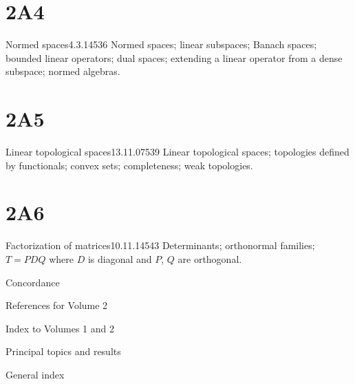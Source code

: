 \section{2A4}{Normed spaces}{4.3.14}{536}{}
{Normed spaces;  linear subspaces;  Banach spaces;
bounded linear operators;  dual spaces;  extending a linear operator
from a dense subspace;  normed algebras.}

\section{2A5}{Linear topological spaces}{13.11.07}{539}{}
{Linear topological spaces;  topologies defined by functionals;
convex sets;  completeness;  weak topologies.}

\section{2A6}{Factorization of matrices}{10.11.14}{543}{}
{Determinants;  orthonormal families;  $T=PDQ$ where $D$ is
diagonal and $P$, $Q$ are orthogonal.}


Concordance 

\medskip

References for Volume 2 

\medskip

Index to Volumes 1 and 2

\qquad Principal topics and results 

\qquad General index 

